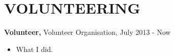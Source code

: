 \section{VOLUNTEERING} 
    {{\bf Volunteer,} Volunteer Organisation}, July 2013 - Now
    \begin{itemize}
	\item What I did.
    \end{itemize}
